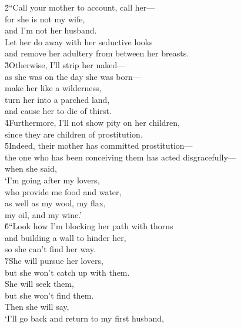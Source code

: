 \begin{poetry}
\poeml \v{2}``Call your mother to account, call her--- \\
\poemll    for she is not my wife, \\
\poemlll       and I'm not her husband. \\
\poeml Let her do away with her seductive looks \\
\poemll    and remove her adultery from between her breasts. \\
\poeml \v{3}Otherwise, I'll strip her naked--- \\
\poemll    as she was on the day she was born--- \\
\poeml make her like a wilderness, \\
\poemll    turn her into a parched land, \\
\poemlll       and cause her to die of thirst. \\
\poeml \v{4}Furthermore, I'll not show pity on her children, \\
\poemll    since they are children of prostitution. \\
\poeml \v{5}Indeed, their mother has committed prostitution--- \\
\poemll    the one who has been conceiving them has acted disgracefully--- \\
\poeml when she said, \\
\poemll    `I'm going after my lovers, \\
\poemlll       who provide me food and water, \\
\poemll    as well as my wool, my flax, \\
\poemlll       my oil, and my wine.' \\
\poeml \v{6}``Look how I'm blocking her path with thorns \\
\poemll    and building a wall to hinder her, \\
\poemlll       so she can't find her way. \\
\poeml \v{7}She will pursue her lovers, \\
\poemll    but she won't catch up with them. \\
\poeml She will seek them, \\
\poemll    but she won't find them. \\
\poeml Then she will say, \\
\poemll    `I'll go back and return to my first husband, \\

\end{poetry}
